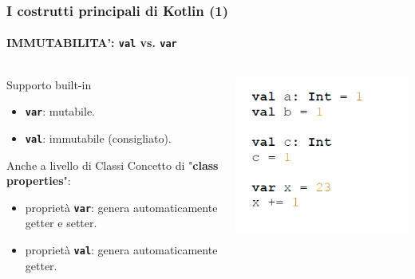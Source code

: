     \begin{frame}
      \frametitle{I costrutti principali di Kotlin (1)}
      \framesubtitle{IMMUTABILITA': \textbf{\texttt{val}} vs. \textbf{\texttt{var}}}
      \begin{columns}
        \begin{column}{0.47\textwidth}
          \begin{block}{Supporto built-in}
            \begin{itemize}
              \item \textbf{\texttt{var}}: mutabile.
              \item \textbf{\texttt{val}}: immutabile (consigliato).
            \end{itemize}
          \end{block}
          \begin{block}{Anche a livello di Classi}
            Concetto di "\textbf{class properties}":
            \begin{itemize}
              \item proprietà \textbf{\texttt{var}}: \alert{genera} automaticamente getter e setter.
              \item proprietà \textbf{\texttt{val}}: \alert{genera} automaticamente getter.
            \end{itemize}
          \end{block}
        \end{column}
        \begin{column}{0.5\textwidth}
            \includegraphics[scale=0.75]{Immutability}
        \end{column}
      \end{columns}
    \end{frame}

